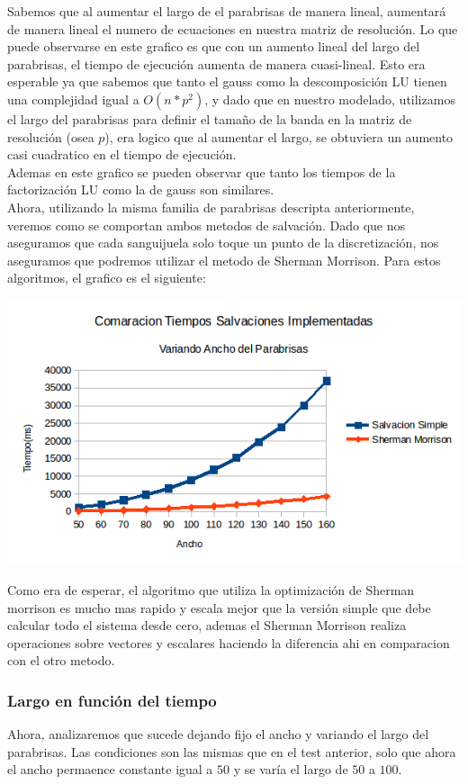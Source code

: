Sabemos que al aumentar el largo de el parabrisas de manera lineal, aumentará de manera lineal el numero de ecuaciones en nuestra matriz de resolución. Lo que puede observarse en este grafico es que con un aumento lineal del largo del parabrisas, el tiempo de ejecución aumenta de manera cuasi-lineal. Esto era esperable ya que sabemos que tanto el gauss como la descomposición LU tienen una complejidad igual a $O(n*p^2)$, y dado que en nuestro modelado, utilizamos el largo del parabrisas para definir el tamaño de la banda en la matriz de resolución (osea $p$), era logico que al aumentar el largo, se obtuviera un aumento casi cuadratico en el tiempo de ejecución.
\\
Ademas en este grafico se pueden observar que tanto los tiempos de la factorización LU como la de gauss son similares.
\\
Ahora, utilizando la misma familia de parabrisas descripta anteriormente, veremos como se comportan ambos metodos de salvación. Dado que nos aseguramos que cada sanguijuela solo toque un punto de la discretización, nos aseguramos que podremos utilizar el metodo de Sherman Morrison. Para estos algoritmos, el grafico es el siguiente:
\\
\begin{center}
 \includegraphics[width=400pt]{imagenes/testeo/anchoSalv.png}
\end{center}

Como era de esperar, el algoritmo que utiliza la optimización de Sherman morrison es mucho mas rapido y escala mejor que la versión simple que debe calcular todo el sistema desde cero, ademas el Sherman Morrison realiza operaciones sobre vectores y escalares haciendo la diferencia ahi en comparacion con el otro metodo.

\subsubsection{Largo en función del tiempo}
Ahora, analizaremos que sucede dejando fijo el ancho y variando el largo del parabrisas. Las condiciones son las mismas que en el test anterior, solo que ahora el ancho permaence constante igual a $50$ y se varía el largo de $50$ a $100$.

